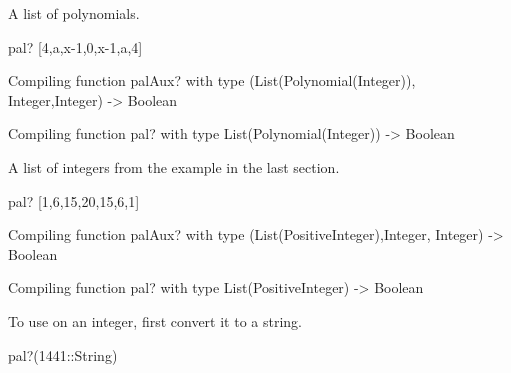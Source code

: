 \begin{xtc}
\begin{xtccomment}
A list of polynomials.
\end{xtccomment}
\begin{spadsrc}
pal? [4,a,x-1,0,x-1,a,4]  
\end{spadsrc}
\begin{MessageOutput}
   Compiling function palAux? with type (List(Polynomial(Integer)),
      Integer,Integer) -> Boolean 
\end{MessageOutput}
\begin{MessageOutput}
   Compiling function pal? with type List(Polynomial(Integer)) -> 
      Boolean 
\end{MessageOutput}
\begin{TeXOutput}
\begin{fricasmath}{4}
%
\end{fricasmath}
\end{TeXOutput}
\end{xtc}
\begin{xtc}
\begin{xtccomment}
A list of integers from the example in
the last section.
\end{xtccomment}
\begin{spadsrc}
pal? [1,6,15,20,15,6,1] 
\end{spadsrc}
\begin{MessageOutput}
   Compiling function palAux? with type (List(PositiveInteger),Integer,
      Integer) -> Boolean 
\end{MessageOutput}
\begin{MessageOutput}
   Compiling function pal? with type List(PositiveInteger) -> Boolean 
\end{MessageOutput}
\begin{TeXOutput}
\begin{fricasmath}{5}
%
\end{fricasmath}
\end{TeXOutput}
\end{xtc}
\begin{xtc}
\begin{xtccomment}
To use  on an integer, first convert it to a string.
\end{xtccomment}
\begin{spadsrc}
pal?(1441::String)
\end{spadsrc}
\begin{TeXOutput}
\begin{fricasmath}{6}
%
\end{fricasmath}
\end{TeXOutput}
\end{xtc}
